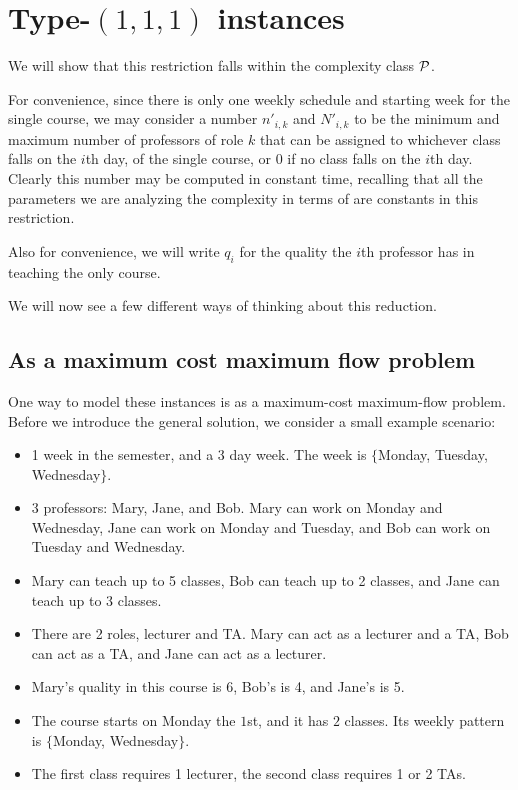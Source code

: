 \section{Type-$(1, 1, 1)$ instances}
We will show that this restriction falls within the complexity class $\mathcal{P}$.

For convenience, since there is only one weekly schedule and starting week for the single course, we may consider a number $n'_{i, k}$ and $N'_{i, k}$ to be the minimum and maximum number of professors of role $k$ that can be assigned to whichever class falls on the $i$th day, of the single course, or $0$ if no class falls on the $i$th day. Clearly this number may be computed in constant time, recalling that all the parameters we are analyzing the complexity in terms of are constants in this restriction.

Also for convenience, we will write $q_i$ for the quality the $i$th professor has in teaching the only course.

We will now see a few different ways of thinking about this reduction.
\subsection{As a maximum cost maximum flow problem}

One way to model these instances is as a maximum-cost maximum-flow problem. Before we introduce the general solution, we consider a small example scenario:

\begin{itemize}
  \item 1 week in the semester, and a 3 day week. The week is $\{$Monday, Tuesday, Wednesday$\}$.
  \item 3 professors: Mary, Jane, and Bob. Mary can work on Monday and Wednesday, Jane can work on Monday and Tuesday, and Bob can work on Tuesday and Wednesday.
  \item Mary can teach up to 5 classes, Bob can teach up to 2 classes, and Jane can teach up to 3 classes.
  \item There are 2 roles, lecturer and TA. Mary can act as a lecturer and a TA, Bob can act as a TA, and Jane can act as a lecturer.
  \item Mary's quality in this course is 6, Bob's is 4, and Jane's is 5.
  \item The course starts on Monday the $1$st, and it has $2$ classes. Its weekly pattern is $\{$Monday, Wednesday$\}$.
  \item The first class requires 1 lecturer, the second class requires 1 or 2 TAs.
\end{itemize}

